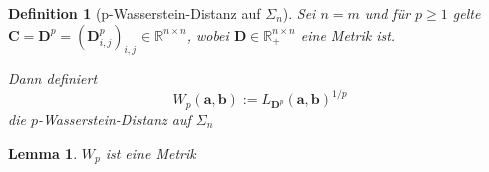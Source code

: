\documentclass[twoside, 12pt,a4paper]{book}
\newtheorem{lemma}[theorem]{Lemma}
\newtheorem{definition}[theorem]{Definition}
\numberwithin{equation}{section}
\begin{document}
	
	\begin{definition}[p-Wasserstein-Distanz auf $\Sigma_n$]
		Sei $n=m$ und für $p \geq 1$ gelte $\boldsymbol{C} = \boldsymbol{D}^p = (\boldsymbol{D}_{i,j}^p)_{i,j} \in \mathbb{R}^{n \times n}$, wobei $\boldsymbol{D} \in \mathbb{R}_+^{n \times n}$ eine Metrik ist.
		
		\noindent Dann definiert 
		\begin{equation}
		W_p(\boldsymbol{a}, \boldsymbol{b}) := L_{\boldsymbol{D}^p} (\boldsymbol{a}, \boldsymbol{b})^{1/p}
		\end{equation} 
		die $p$-Wasserstein-Distanz auf $\Sigma_n$
	\end{definition}
	
	\begin{lemma}\cite{COTcuturi, villani2003topics}
		$W_p$ ist eine Metrik
	\end{lemma}
	
\end{document}
